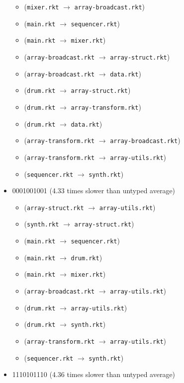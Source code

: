 \documentclass{article}
\newcommand{\mono}[1]{\texttt{#1}}
\begin{document}
\begin{itemize}
\begin{itemize}
  \item (\mono{mixer.rkt} $\rightarrow$ \mono{array-broadcast.rkt})
  \item (\mono{main.rkt} $\rightarrow$ \mono{sequencer.rkt})
  \item (\mono{main.rkt} $\rightarrow$ \mono{mixer.rkt})
  \item (\mono{array-broadcast.rkt} $\rightarrow$ \mono{array-struct.rkt})
  \item (\mono{array-broadcast.rkt} $\rightarrow$ \mono{data.rkt})
  \item (\mono{drum.rkt} $\rightarrow$ \mono{array-struct.rkt})
  \item (\mono{drum.rkt} $\rightarrow$ \mono{array-transform.rkt})
  \item (\mono{drum.rkt} $\rightarrow$ \mono{data.rkt})
  \item (\mono{array-transform.rkt} $\rightarrow$ \mono{array-broadcast.rkt})
  \item (\mono{array-transform.rkt} $\rightarrow$ \mono{array-utils.rkt})
  \item (\mono{sequencer.rkt} $\rightarrow$ \mono{synth.rkt})
  \end{itemize}
\item 0001001001 (4.33 times slower than untyped average)
  \begin{itemize}
  \item (\mono{array-struct.rkt} $\rightarrow$ \mono{array-utils.rkt})
  \item (\mono{synth.rkt} $\rightarrow$ \mono{array-struct.rkt})
  \item (\mono{main.rkt} $\rightarrow$ \mono{sequencer.rkt})
  \item (\mono{main.rkt} $\rightarrow$ \mono{drum.rkt})
  \item (\mono{main.rkt} $\rightarrow$ \mono{mixer.rkt})
  \item (\mono{array-broadcast.rkt} $\rightarrow$ \mono{array-utils.rkt})
  \item (\mono{drum.rkt} $\rightarrow$ \mono{array-utils.rkt})
  \item (\mono{drum.rkt} $\rightarrow$ \mono{synth.rkt})
  \item (\mono{array-transform.rkt} $\rightarrow$ \mono{array-utils.rkt})
  \item (\mono{sequencer.rkt} $\rightarrow$ \mono{synth.rkt})
  \end{itemize}
\item 1110101110 (4.36 times slower than untyped average)
  \begin{itemize}

\end{itemize}
\end{itemize}
\end{document}
